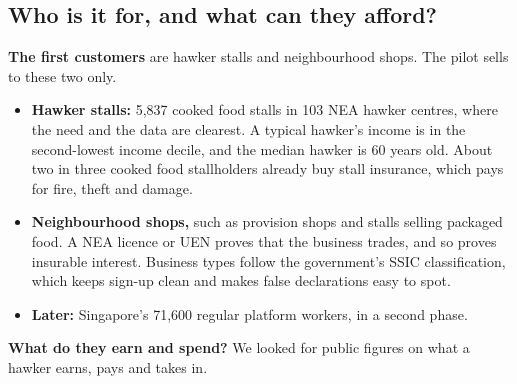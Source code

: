 \documentclass[11pt,a4paper]{article}
\begin{document}
\subsection{Who is it for, and what can they afford?}\label{sec:customer}

\textbf{The first customers} are hawker stalls and neighbourhood shops. The pilot sells to these two only.
\begin{itemize}[leftmargin=1.2em]
  \item \textbf{Hawker stalls:} 5,837 cooked food stalls in 103 NEA hawker centres, where the need and the data are clearest.\cite{nea-hawker} A typical hawker's income is in the second-lowest income decile, and the median hawker is 60 years old.\cite{koh-hawker} About two in three cooked food stallholders already buy stall insurance, which pays for fire, theft and damage.\cite{mse-hawker}
  \item \textbf{Neighbourhood shops,} such as provision shops and stalls selling packaged food. A NEA licence or UEN proves that the business trades, and so proves insurable interest. Business types follow the government's SSIC classification, which keeps sign-up clean and makes false declarations easy to spot.
  \item \textbf{Later:} Singapore's 71,600 regular platform workers, in a second phase.\cite{ps}
\end{itemize}

\textbf{What do they earn and spend?} We looked for public figures on what a hawker earns, pays and takes in.
\end{document}
